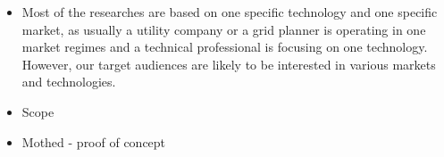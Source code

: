 \begin{itemize}
	\item Most of the researches are based on one specific technology and one specific market, as usually a utility company or a grid planner is operating in one market regimes and a technical professional is focusing on one technology.  However, our target audiences are likely to be interested in various markets and technologies.
	\item Scope
	\item Mothed - proof of concept
\end{itemize}
